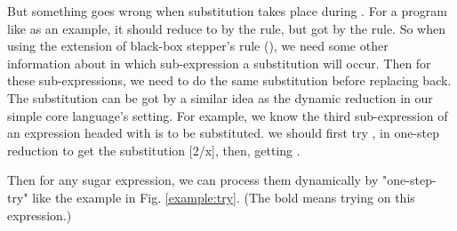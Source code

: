 But something goes wrong when substitution takes place during . For a program like  as an example, it should reduce to  by the  rule, but got  by the  rule. So when using the extension of black-box stepper's rule (), we need some other information about in which sub-expression a substitution will occur. Then for these sub-expressions, we need to do the same substitution before replacing back. The substitution can be got by a similar idea as the dynamic reduction in our simple core language's setting. For example, we know the third sub-expression of an expression headed with  is to be substituted. we should first try ,  in one-step reduction to get the substitution [2/x], then, getting .

Then for any sugar expression, we can process them dynamically by "one-step-try" like the example in Fig.  \ref{example:try}. (The bold  means trying on this expression.)



